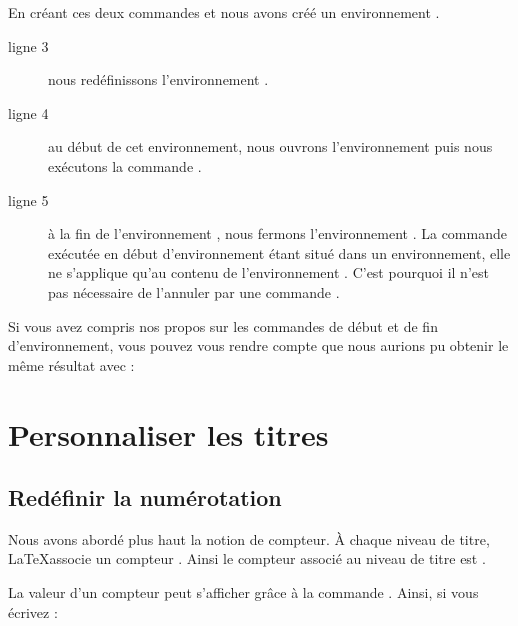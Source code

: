 En créant ces deux commandes  et  nous avons créé un environnement .

\begin{description}
\item[ligne 3]nous redéfinissons l'environnement .
\item[ligne 4]au début de cet environnement, nous ouvrons l'environnement  puis nous exécutons la commande .
\item[ligne 5]à la fin de l'environnement , nous fermons l'environnement . La commande  exécutée en début d'environnement étant situé dans un environnement, elle ne s'applique qu'au contenu de l'environnement . C'est pourquoi il n'est pas nécessaire de l'annuler par une commande . 
\end{description}

\begin{plusloins}
Si vous avez compris nos propos sur les commandes de début et de fin d'environnement, vous pouvez vous rendre compte que nous aurions pu obtenir le même résultat avec :

\begin{latexcode}
\let\oldquotation\quotation
\let\endoldquotation\endquotation
\renewcommand{\quotation}{\oldquotation\singlespace}
\renewcommand{\endquotation}{\endoldquotation}
\end{latexcode}

\end{plusloins}

\section{Personnaliser les titres}

\subsection{Redéfinir la numérotation}\label{apparencecompteur}
Nous avons abordé plus haut la notion de compteur. À chaque niveau de titre, \LaTeX associe un compteur . Ainsi le compteur associé au niveau de titre  est .

La valeur d'un compteur peut s'afficher grâce à la commande . Ainsi, si vous écrivez :
 
